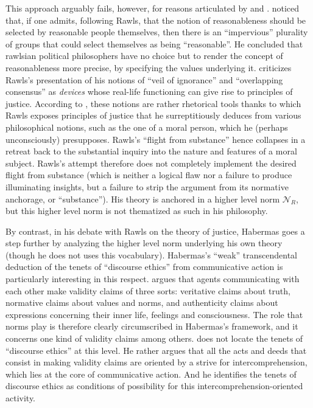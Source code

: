 \documentclass[preprint, french, english, 11pt, authoryear]{elsarticle}%
\begin{document}
This approach arguably fails, however, for reasons articulated by \cite{habermas_reconciliation_1995} and \cite{estlund_democratic_2009}. \citet{estlund_democratic_2009} noticed that, if one admits, following Rawls, that the notion of reasonableness should be selected by reasonable people themselves, then there is an “impervious” plurality of groups that could select themselves as being “reasonable”. He concluded that rawlsian political philosophers have no choice but to render the concept of reasonableness more precise, by specifying the values underlying it. \cite{habermas_reconciliation_1995} criticizes Rawls's presentation of his notions of “veil of ignorance” and  “overlapping consensus” as \emph{devices} whose real-life functioning can give rise to principles of justice. According to \cite{habermas_reconciliation_1995}, these notions are rather rhetorical tools thanks to which Rawls exposes principles of justice that he surreptitiously deduces from various philosophical notions, such as the one of a moral person, which he (perhaps unconsciously) presupposes. Rawls's ``flight from substance'' hence collapses in a retreat back to the substantial inquiry into the nature and features of a moral subject.  Rawls's attempt therefore does not completely implement the desired flight from substance (which is neither a logical flaw nor a failure to produce illuminating insights, but a failure to strip the argument from its normative anchorage, or “substance”). His theory is anchored in a higher level norm $\mathscr{N}_R$, but this higher level norm is not thematized as such in his philosophy.

By contrast, in his debate with Rawls on the theory of justice, Habermas goes a step further by analyzing the higher level norm underlying his own theory (though he does not uses this vocabulary).  Habermas's “weak” transcendental deduction of the tenets of “discourse ethics” from communicative action \citep{habermas_moralbewustsein_1983} is particularly interesting in this respect. \citet{habermas_theorie_1981} argues that agents communicating with each other make validity claims of three sorts: veritative claims about truth, normative claims about values and norms, and authenticity claims about expressions concerning their inner life, feelings and consciousness. The role that norms play is therefore clearly circumscribed in Habermas's framework, and it concerns one kind of validity claims among others. \cite{habermas_moralbewustsein_1983} does not locate the tenets of “discourse ethics” at this level. He rather argues that all the acts and deeds that consist in making validity claims are oriented by a strive for intercomprehension, which lies at the core of communicative action. And he identifies the tenets of discourse ethics as conditions of possibility for this intercomprehension-oriented activity. 
\end{document}
